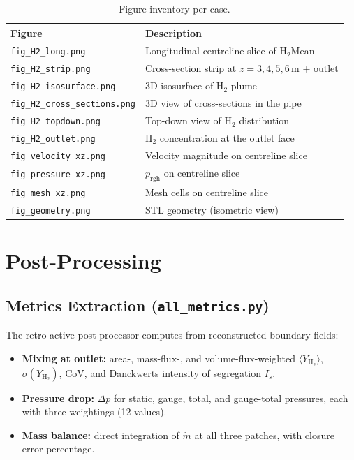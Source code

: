 \documentclass[12pt,a4paper]{report}
\begin{document}
\begin{table}[H]
\centering
\caption{Figure inventory per case.}
\small
\begin{tabularx}{\textwidth}{@{}lX@{}}
\toprule
\textbf{Figure} & \textbf{Description} \\
\midrule
\texttt{fig\_H2\_long.png}    & Longitudinal centreline slice of H$_2$Mean \\
\texttt{fig\_H2\_strip.png}   & Cross-section strip at $z = 3, 4, 5, 6$\,m + outlet \\
\texttt{fig\_H2\_isosurface.png} & 3D isosurface of H$_2$ plume \\
\texttt{fig\_H2\_cross\_sections.png} & 3D view of cross-sections in the pipe \\
\texttt{fig\_H2\_topdown.png}  & Top-down view of H$_2$ distribution \\
\texttt{fig\_H2\_outlet.png}   & H$_2$ concentration at the outlet face \\
\texttt{fig\_velocity\_xz.png} & Velocity magnitude on centreline slice \\
\texttt{fig\_pressure\_xz.png} & $p_{\mathrm{rgh}}$ on centreline slice \\
\texttt{fig\_mesh\_xz.png}    & Mesh cells on centreline slice \\
\texttt{fig\_geometry.png}     & STL geometry (isometric view) \\
\bottomrule
\end{tabularx}
\end{table}


\chapter{Post-Processing}
\label{ch:post}

\section{Metrics Extraction (\texttt{all\_metrics.py})}

The retro-active post-processor computes from reconstructed boundary
fields:

\begin{itemize}
  \item \textbf{Mixing at outlet:} area-, mass-flux-, and
        volume-flux-weighted $\langle Y_{\mathrm{H_2}} \rangle$,
        $\sigma(Y_{\mathrm{H_2}})$, CoV, and Danckwerts intensity
        of segregation $I_s$.
  \item \textbf{Pressure drop:} $\Delta p$ for static, gauge,
        total, and gauge-total pressures, each with three weightings
        (12 values).
  \item \textbf{Mass balance:} direct integration of $\dot{m}$ at
        all three patches, with closure error percentage.
\end{itemize}
\end{document}
